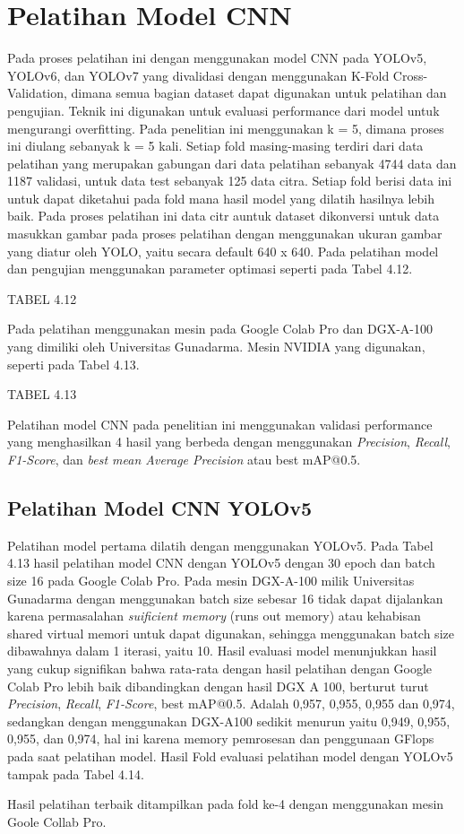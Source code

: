 \section{Pelatihan Model CNN}
\hspace{1,2cm}
Pada proses pelatihan ini dengan menggunakan model CNN pada YOLOv5, YOLOv6, dan YOLOv7 yang divalidasi dengan menggunakan K-Fold Cross-Validation, dimana semua bagian dataset dapat digunakan untuk pelatihan dan pengujian. Teknik ini digunakan untuk evaluasi performance dari model untuk mengurangi overfitting.  Pada penelitian ini menggunakan k = 5, dimana proses ini diulang sebanyak k = 5 kali. Setiap fold masing-masing terdiri dari data pelatihan yang merupakan gabungan dari data pelatihan sebanyak 4744 data dan 1187 validasi, untuk data test sebanyak 125 data citra. Setiap fold berisi data ini untuk dapat diketahui pada fold mana hasil model yang dilatih hasilnya lebih baik. Pada proses pelatihan ini data citr auntuk dataset dikonversi untuk data masukkan gambar pada proses pelatihan dengan menggunakan ukuran gambar yang diatur oleh YOLO, yaitu secara default 640 x 640. Pada pelatihan model dan pengujian menggunakan parameter optimasi seperti pada Tabel 4.12.

TABEL 4.12

Pada pelatihan menggunakan mesin pada Google Colab Pro dan DGX-A-100 yang dimiliki oleh Universitas Gunadarma. Mesin NVIDIA yang digunakan, seperti pada Tabel 4.13. 


TABEL 4.13

Pelatihan model CNN pada penelitian ini menggunakan validasi performance yang menghasilkan 4 hasil yang berbeda dengan menggunakan \textit{Precision}, \textit{Recall}, \textit{F1-Score}, dan \textit{best mean Average Precision} atau best mAP@0.5.

\subsection{Pelatihan Model CNN YOLOv5}
\hspace{1,2cm}
Pelatihan model pertama dilatih dengan menggunakan YOLOv5. Pada Tabel 4.13 hasil pelatihan model CNN dengan YOLOv5 dengan 30 epoch dan batch size 16 pada Google Colab Pro. Pada mesin DGX-A-100 milik Universitas Gunadarma dengan menggunakan batch size sebesar 16 tidak dapat dijalankan karena permasalahan \textit{suificient memory} (runs out memory) atau kehabisan shared virtual memori untuk dapat digunakan, sehingga menggunakan batch size dibawahnya dalam 1 iterasi, yaitu 10. Hasil evaluasi model menunjukkan hasil yang cukup signifikan bahwa rata-rata dengan hasil pelatihan dengan Google Colab Pro lebih baik dibandingkan dengan hasil DGX A 100, berturut turut \textit{Precision}, \textit{Recall}, \textit{F1-Score}, best mAP@0.5. Adalah 0,957, 0,955, 0,955 dan 0,974, sedangkan dengan menggunakan DGX-A100 sedikit menurun yaitu 0,949, 0,955, 0,955, dan 0,974, hal ini karena memory pemrosesan dan penggunaan GFlops pada saat pelatihan model. Hasil Fold evaluasi pelatihan model dengan YOLOv5 tampak pada Tabel 4.14.

Hasil pelatihan terbaik ditampilkan pada fold ke-4 dengan menggunakan mesin Goole Collab Pro. 